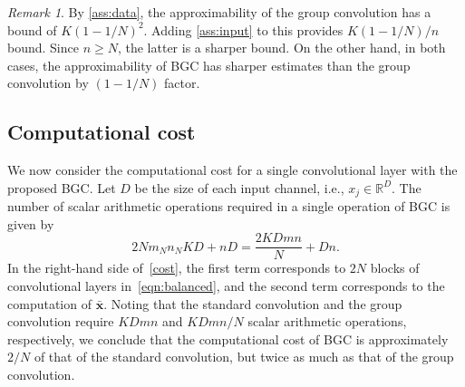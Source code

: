 \documentclass[preprint,12pt,authoryear]{elsarticle}
\numberwithin{equation}{section}
\theoremstyle{remark}
\newtheorem{remark}[theorem]{Remark}
\newcommand\bx{\mathbf{x}}
\begin{document}
\begin{remark}
By \cref{ass:data}, the approximability of the group convolution has a bound of $K(1-1/N)^{2}$.
Adding \cref{ass:input} to this provides $K(1-1/N)/n$ bound.
Since $n \geq N$, the latter is a sharper bound.
On the other hand, in both cases, the approximability of BGC has sharper estimates than the group convolution by $(1-1/N)$ factor.
\end{remark}

\subsection{Computational cost}
\label{Sec:cost}
We now consider the computational cost for a single convolutional layer with the proposed BGC.
Let $D$ be the size of each input channel, i.e., $x_{j} \in \mathbb{R}^{D}$.
The number of scalar arithmetic operations required in a single operation of BGC is given by
\begin{equation}
    \label{cost}
    2N m_N n_N KD + n D = \frac{2KDmn}{N} + Dn.
\end{equation}
In the right-hand side of~\eqref{cost}, the first term corresponds to $2N$ blocks of convolutional layers in~\eqref{eqn:balanced}, and the second term corresponds to the computation of $\bar{\bx}$.
Noting that the standard convolution and the group convolution require $KDmn$ and $KDmn/N$ scalar arithmetic operations, respectively, we conclude that the computational cost of BGC is approximately $2/N$ of that of the standard convolution, but twice as much as that of the group convolution.

\end{document}
